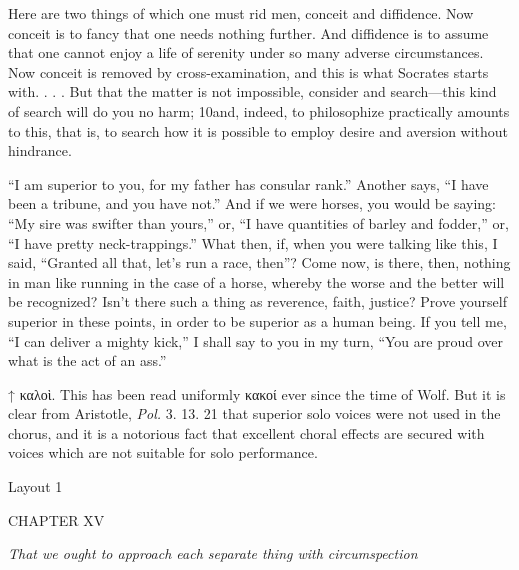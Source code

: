 Here are two things of which one must rid men, conceit and diffidence. Now conceit is to fancy that one needs nothing further. And diffidence is to assume that one cannot enjoy a life of serenity under so many adverse circumstances. Now conceit is removed by cross-examination, and this is what Socrates starts with. . . . But that the matter is not impossible, consider and search—this kind of search will do you no harm; 10and, indeed, to philosophize practically amounts to this, that is, to search how it is possible to employ desire and aversion without hindrance.

``I am superior to you, for my father has consular rank.'' Another says, ``I have been a tribune, and you have not.'' And if we were horses, you would be saying: ``My sire was swifter than yours,'' or, ``I have quantities of barley and fodder,'' or, ``I have pretty neck-trappings.'' What then, if, when you were talking like this, I said, ``Granted all that, let's run a race, then''? Come now, is there, then, nothing in man like running in the case of a horse, whereby the worse and the better will be recognized? Isn't there such a thing as reverence, faith, justice? Prove yourself superior in these points, in order to be superior as a human being. If you tell me, ``I can deliver a mighty kick,'' I shall say to you in my turn, ``You are proud over what is the act of an ass.''



↑ καλοὶ. This has been read uniformly κακοί ever since the time of Wolf. But it is clear from Aristotle, \emph{Pol.} 3. 13. 21 that superior solo voices were not used in the chorus, and it is a notorious fact that excellent choral effects are secured with voices which are not suitable for solo performance.


Layout 1

CHAPTER XV

\emph{That we ought to approach each separate thing with circumspection}

